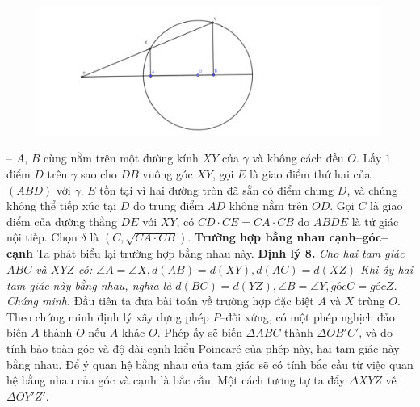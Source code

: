 \begin{multicols}{2}
\begin{figure}[H]
		\captionsetup{labelformat= empty, justification=centering}
		\includegraphics[width= 1\linewidth]{TH_4_dinh_ly_xay_dung.pdf}
		\vspace*{-20pt}
	\end{figure}
	-- $A$, $B$ cùng nằm trên một đường kính $XY$ của $\gamma$ và không cách đều $O$. Lấy $1$ điểm $D$ trên $\gamma$ sao cho $DB$ vuông góc $XY$, gọi $E$ là giao điểm thứ hai của $(ABD)$ với $\gamma$. $E$ tồn tại vì hai đường tròn đã sẵn có điểm chung $D$, và chúng không thể tiếp xúc tại $D$ do trung điểm $AD$ không nằm trên $OD$. Gọi $C$ là giao điểm của đường thẳng $DE$ với $XY$, có $CD\cdot CE = CA\cdot CB$ do $ABDE$ là tứ giác nội tiếp. Chọn $\delta$ là $(C, \sqrt{CA\cdot CB})$.
	\vskip 0.1cm
	\textbf{\color{lichsutoanhoc}Trường hợp bằng nhau cạnh--góc--cạnh}
	\vskip 0.1cm
	Ta phát biểu lại trường hợp bằng nhau này.
	\vskip 0.1cm
	\textbf{\color{lichsutoanhoc}Định lý $\pmb8$.}\textit{
		Cho hai tam giác $ABC$ và $XYZ$ có: $ \angle A = \angle X, d(AB) = d(XY), d(AC) = d(XZ)$
		Khi ấy hai tam giác này bằng nhau, nghĩa là $d(BC)  = d(YZ), \angle B = \angle Y, góc C = góc Z$.
	}
	\vskip 0.1cm
	\textit{Chứng minh.} Đầu tiên ta đưa bài toán về trường hợp đặc biệt $A$ và $X$ trùng $O$.
	Theo chứng minh định lý xây dựng phép $P$--đối xứng, có một phép nghịch đảo biến $A$ thành $O$ nếu $A$ khác $O$. Phép ấy sẽ biến $\Delta ABC$ thành $\Delta OB'C'$, và do tính bảo toàn góc và độ dài cạnh kiểu Poincar\'e của phép này, hai tam giác này bằng nhau. Để ý quan hệ bằng nhau của tam giác sẽ có tính bắc cầu từ việc quan hệ bằng nhau của góc và cạnh là bắc cầu. Một cách tương tự ta đẩy $\Delta XYZ$ về $ \Delta OY'Z'$.
	\begin{figure}[H]
		\vspace*{-5pt}
		\centering
		\captionsetup{labelformat= empty, justification=centering}

\end{figure}
\end{multicols}
